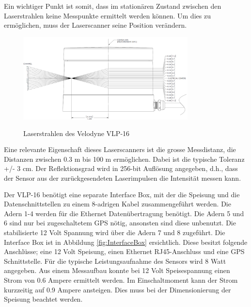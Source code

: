 Ein wichtiger Punkt ist somit, dass im stationären Zustand zwischen den Laserstrahlen keine Messpunkte ermittelt werden können. Um dies zu ermöglichen, muss der Laserscanner seine Position verändern.

\begin{figure}[H]
	\centering
	\includegraphics[width=0.8\textwidth]
	{resources/velodyne_channels.PNG}
	\caption[Laserstrahlen des Velodyne  VLP-16]{Laserstrahlen des Velodyne  VLP-16} \protect\cite{velodyne}
	\label{fig:angleVLP}
\end{figure}

Eine relevante Eigenschaft dieses Laserscanners ist die grosse Messdistanz, die Distanzen zwischen 0.3 m bis 100 m ermöglichen. Dabei ist die typische Toleranz +/- 3 cm. Der Reflektionsgrad wird in 256-bit Auflösung angegeben, d.h., dass der Sensor aus der zurückgesendeten Laserimpulsen die Intensität messen kann.

Der VLP-16 benötigt eine separate Interface Box, mit der die Speisung und die Datenschnittstellen zu einem 8-adrigen Kabel zusammengeführt werden. Die Adern 1-4 werden für die Ethernet Datenübertragung benötigt. Die Adern 5 und 6 sind nur bei zugeschaltetem \ac{GPS} nötig, ansonsten sind diese unbenutzt. Die stabilisierte 12 Volt Spannung wird über die Adern 7 und 8 zugeführt. Die Interface Box ist in Abbildung \ref{fig:InterfaceBox} ersichtlich. Diese besitzt folgende Anschlüsse; eine 12 Volt Speisung, einen Ethernet RJ45-Anschluss und eine \ac{GPS} Schnittstelle. Für die typische Leistungsaufnahme des Sensors wird 8 Watt angegeben. Aus einem Messaufbau konnte bei 12 Volt Speisespannung einen Strom von 0.6 Ampere ermittelt werden. Im Einschaltmoment kann der Strom kurzzeitig auf 0.9 Ampere ansteigen. Dies muss bei der Dimensionierung der Speisung beachtet werden.  

